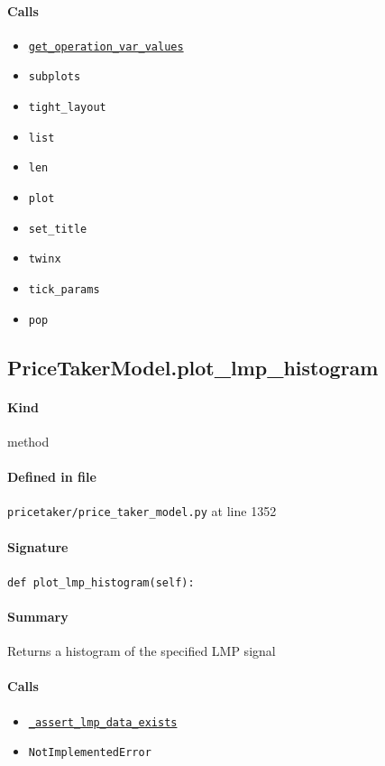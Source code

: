 \documentclass[11pt]{report}
\begin{document}
\paragraph{Calls}
\begin{itemize}[leftmargin=*]
  \item \hyperref[def:pricetaker-price_taker_model.py:PriceTakerModel.get_operation_var_values:L1202]{\texttt{get\_operation\_var\_values}}
  \item \texttt{subplots}
  \item \texttt{tight\_layout}
  \item \texttt{list}
  \item \texttt{len}
  \item \texttt{plot}
  \item \texttt{set\_title}
  \item \texttt{twinx}
  \item \texttt{tick\_params}
  \item \texttt{pop}
\end{itemize}
\subsection{PriceTakerModel.plot\_lmp\_histogram}
\label{def:pricetaker-price_taker_model.py:PriceTakerModel.plot_lmp_histogram:L1352}
\paragraph{Kind} method
\paragraph{Defined in file} \texttt{pricetaker/price\_taker\_model.py} at line 1352
\paragraph{Signature} \texttt{def plot\_lmp\_histogram(self):}
\paragraph{Summary} Returns a histogram of the specified LMP signal
\paragraph{Calls}
\begin{itemize}[leftmargin=*]
  \item \hyperref[def:pricetaker-price_taker_model.py:PriceTakerModel._assert_lmp_data_exists:L213]{\texttt{\_assert\_lmp\_data\_exists}}
  \item \texttt{NotImplementedError}
\end{itemize}
\end{document}
